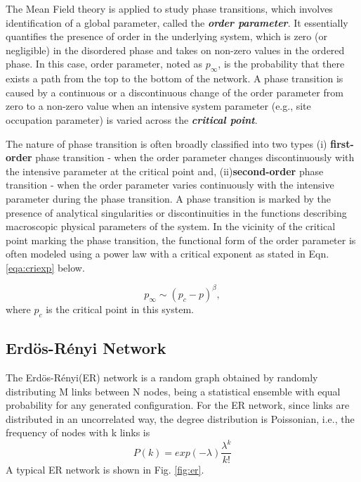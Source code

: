 \documentclass[11pt]{article}
\begin{document}
The Mean Field theory is applied to study phase transitions, which involves identification of a global parameter, called the \textbf{\textit{order parameter}}. It essentially quantifies the presence of order in the underlying system, which is zero (or negligible) in the disordered phase and takes on non-zero values in the ordered phase. 
In this case, order parameter, noted as $p_\infty$, is the probability that there exists a path from the top to the bottom of the network. A phase transition is caused by a continuous or a discontinuous change of the order parameter from zero to a non-zero value when an intensive system parameter (e.g., site occupation parameter) is varied across the \textbf{\textit{critical point}}.

The nature of phase transition is often broadly classified into two types (i) \textbf{first-order} phase transition - when the order parameter changes discontinuously with the intensive parameter at the critical point and, (ii)\textbf{second-order} phase transition - when the order parameter varies continuously with the intensive parameter during the phase transition. A phase transition is marked by the presence of analytical singularities or discontinuities in the functions describing macroscopic physical parameters of the system. In the vicinity of the critical point marking the phase transition, the functional form of the order parameter is often modeled using a power law with a critical exponent as stated in Eqn. \ref{eqa:criexp} below.

\begin{equation}
    p_\infty \sim (p_c-p)^{\beta},
    \label{eqa:criexp}
\end{equation}
where $p_c$ is the critical point in this system.

\subsection{Erd\"{o}s-R\'{e}nyi Network}
The Erd\"{o}s-R\'{e}nyi(ER) network is a random graph obtained by randomly distributing M links between N nodes, being a statistical ensemble with equal probability for any generated configuration. For the ER network, since links are distributed in an uncorrelated way, the degree distribution is Poissonian, i.e., the frequency of nodes with k links is
\begin{equation}
    P(k) = exp(-\lambda) \frac{\lambda^k}{k!}
    \label{eqn:erpk}
\end{equation}
A typical ER network is shown in Fig. \ref{fig:er}.
\end{document}
